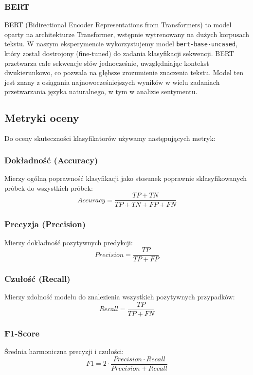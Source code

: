 \documentclass[runningheads]{llncs}
\begin{document}
\subsubsection{BERT}
BERT (Bidirectional Encoder Representations from Transformers) to model oparty na architekturze Transformer, wstępnie wytrenowany na dużych korpusach tekstu. W naszym eksperymencie wykorzystujemy model \texttt{bert-base-uncased}, który został dostrojony (fine-tuned) do zadania klasyfikacji sekwencji. BERT przetwarza całe sekwencje słów jednocześnie, uwzględniając kontekst dwukierunkowo, co pozwala na głębsze zrozumienie znaczenia tekstu. Model ten jest znany z osiągania najnowocześniejszych wyników w wielu zadaniach przetwarzania języka naturalnego, w tym w analizie sentymentu.

\subsection{Metryki oceny}
Do oceny skuteczności klasyfikatorów używamy następujących metryk:

\subsubsection{Dokładność (Accuracy)}
Mierzy ogólną poprawność klasyfikacji jako stosunek poprawnie sklasyfikowanych próbek do wszystkich próbek:
\begin{equation}
    Accuracy = \frac{TP + TN}{TP + TN + FP + FN}
\end{equation}

\subsubsection{Precyzja (Precision)}
Mierzy dokładność pozytywnych predykcji:
\begin{equation}
    Precision = \frac{TP}{TP + FP}
\end{equation}

\subsubsection{Czułość (Recall)}
Mierzy zdolność modelu do znalezienia wszystkich pozytywnych przypadków:
\begin{equation}
    Recall = \frac{TP}{TP + FN}
\end{equation}

\subsubsection{F1-Score}
Średnia harmoniczna precyzji i czułości:
\begin{equation}
    F1 = 2 \cdot \frac{Precision \cdot Recall}{Precision + Recall}
\end{equation}
\end{document}
